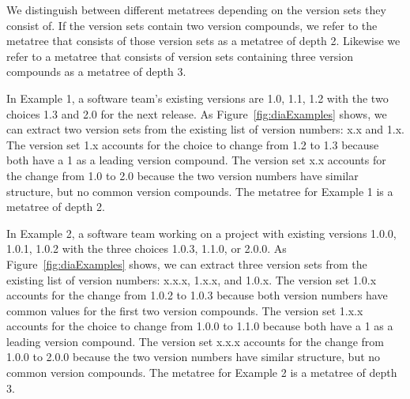 \documentclass[conference]{IEEEtran}
\begin{document}

We distinguish between different metatrees depending on the version sets they consist of. If the version sets contain two version compounds, we refer to the metatree that consists of those version sets as a metatree of depth 2. 
Likewise we refer to a metatree that consists of version sets containing three version compounds as a metatree of depth 3.




In Example 1, a software team's existing versions are 1.0, 1.1, 1.2 with the two choices 1.3 and 2.0 for the next release. As Figure~\ref{fig:diaExamples} shows, we can extract two version sets from the existing list of version numbers: x.x and 1.x. The version set 1.x accounts for the choice to change from 1.2 to 1.3 because both have a 1 as a leading version compound. The version set x.x accounts for the change from 1.0 to 2.0 because the two version numbers have similar structure, but no common version compounds.
The metatree for Example 1 is a metatree of depth 2.


In Example 2, a software team working on a project with existing versions 1.0.0, 1.0.1, 1.0.2 with the three choices 1.0.3, 1.1.0, or 2.0.0. 
As Figure~\ref{fig:diaExamples} shows, we can extract three version sets from the existing list of version numbers: x.x.x, 1.x.x, and 1.0.x. 
The version set 1.0.x accounts for the change from 1.0.2 to 1.0.3 because both version numbers have common values for the first two version compounds. 
The version set 1.x.x accounts for the choice to change from 1.0.0 to 1.1.0 because both have a 1 as a leading version compound. 
The version set x.x.x accounts for the change from 1.0.0 to 2.0.0 because the two version numbers have similar structure, but no common version compounds.
The metatree for Example 2 is a metatree of depth 3.


\end{document}

